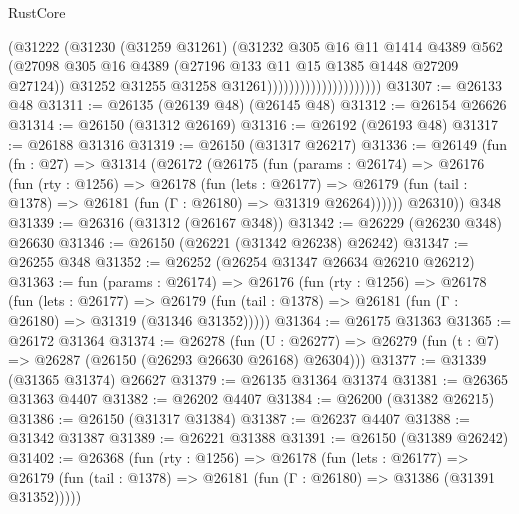 \begin{lexlean}{RustCore}
\begin{coremodule}
                                        (@31222
                                          (@31230
                                            (@31259 @31261)
                                            (@31232
                                              @305
                                              @16
                                              @11
                                              @1414
                                              @4389
                                              @562
                                              (@27098
                                                @305
                                                @16
                                                @4389
                                                (@27196 @133 @11 @15 @1385 @1448 @27209 @27124))
                                              @31252
                                              @31255
                                              @31258
                                              @31261)))))))))))))))))))))
@31307 := @26133 @48
@31311 := @26135 (@26139 @48) (@26145 @48)
@31312 := @26154 @26626
@31314 := @26150 (@31312 @26169)
@31316 := @26192 (@26193 @48)
@31317 := @26188 @31316
@31319 := @26150 (@31317 @26217)
@31336 := @26149
    (fun (fn : @27) =>
    @31314
      (@26172
        (@26175
          (fun (params : @26174) =>
          @26176
            (fun (rty : @1256) =>
            @26178
              (fun (lets : @26177) =>
              @26179 (fun (tail : @1378) => @26181 (fun (Γ : @26180) => @31319 @26264))))))
        @26310))
    @348
@31339 := @26316 (@31312 (@26167 @348))
@31342 := @26229 (@26230 @348) @26630
@31346 := @26150 (@26221 (@31342 @26238) @26242)
@31347 := @26255 @348
@31352 := @26252 (@26254 @31347 @26634 @26210 @26212)
@31363 := fun (params : @26174) =>
  @26176
    (fun (rty : @1256) =>
    @26178
      (fun (lets : @26177) =>
      @26179 (fun (tail : @1378) => @26181 (fun (Γ : @26180) => @31319 (@31346 @31352)))))
@31364 := @26175 @31363
@31365 := @26172 @31364
@31374 := @26278
    (fun (U : @26277) => @26279 (fun (t : @7) => @26287 (@26150 (@26293 @26630 @26168) @26304)))
@31377 := @31339 (@31365 @31374) @26627
@31379 := @26135 @31364 @31374
@31381 := @26365 @31363 @4407
@31382 := @26202 @4407
@31384 := @26200 (@31382 @26215)
@31386 := @26150 (@31317 @31384)
@31387 := @26237 @4407
@31388 := @31342 @31387
@31389 := @26221 @31388
@31391 := @26150 (@31389 @26242)
@31402 := @26368
    (fun (rty : @1256) =>
    @26178
      (fun (lets : @26177) =>
      @26179 (fun (tail : @1378) => @26181 (fun (Γ : @26180) => @31386 (@31391 @31352)))))

\end{coremodule}
\end{lexlean}
